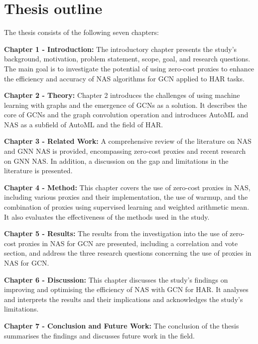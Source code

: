 \section{Thesis outline}

The thesis consists of the following seven chapters:

\textbf{Chapter 1 - Introduction:} The introductory chapter presents the study's background, motivation, problem statement, scope, goal, and research questions. The main goal is to investigate the potential of using zero-cost proxies to enhance the efficiency and accuracy of \gls{NAS} algorithms for \gls{GCN} applied to \gls{HAR} tasks. 

\textbf{Chapter 2 - Theory:} Chapter 2 introduces the challenges of using machine learning with graphs and the emergence of \gls{GCN}s as a solution. It describes the core of \glspl{GCN} and the graph convolution operation and introduces \gls{AutoML} and \gls{NAS} as a subfield of \gls{AutoML} and the field of \gls{HAR}. 

\textbf{Chapter 3 - Related Work:} A comprehensive review of the literature on \gls{NAS} and \gls{GNN} \gls{NAS} is provided, encompassing zero-cost proxies and recent research on \gls{GNN} \gls{NAS}. In addition, a discussion on the gap and limitations in the literature is presented. 

\textbf{Chapter 4 - Method:} This chapter covers the use of zero-cost proxies in \gls{NAS}, including various proxies and their implementation, the use of warmup, and the combination of proxies using supervised learning and weighted arithmetic mean. It also evaluates the effectiveness of the methods used in the study.

\textbf{Chapter 5 - Results:} The results from the investigation into the use of zero-cost proxies in \gls{NAS} for \gls{GCN} are presented, including a correlation and vote section, and address the three research questions concerning the use of proxies in \gls{NAS} for \gls{GCN}.

\textbf{Chapter 6 - Discussion:} This chapter discusses the study's findings on improving and optimising the efficiency of \gls{NAS} with \gls{GCN} for \gls{HAR}. It analyses and interprets the results and their implications and acknowledges the study's limitations.

\textbf{Chapter 7 - Conclusion and Future Work:} The conclusion of the thesis summarises the findings and discusses future work in the field.